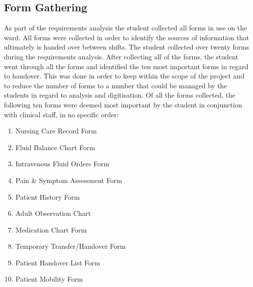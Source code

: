 \subsection{Form Gathering}
As part of the requirements analysis the student collected all forms in use on the ward. All forms were collected in order to identify the sources of information that ultimately is handed over between shifts. The student collected over twenty forms during the requirements analysis. After collecting all of the forms, the student went through all the forms and identified the ten most important forms in regard to handover. This was done in order to keep within the scope of the project and to reduce the number of forms to a number that could be managed by the students in regard to analysis and digitisation. Of all the forms collected, the following ten forms were deemed most important by the student in conjunction with clinical staff, in no specific order:

\begin{enumerate}
\item Nursing Care Record Form
\item Fluid Balance Chart Form
\item Intravenous Fluid Orders Form
\item Pain \& Symptom Assessment Form
\item Patient History Form
\item Adult Observation Chart
\item Medication Chart Form
\item Temporary Transfer/Handover Form
\item Patient Handover List Form
\item Patient Mobility Form
\end{enumerate}

